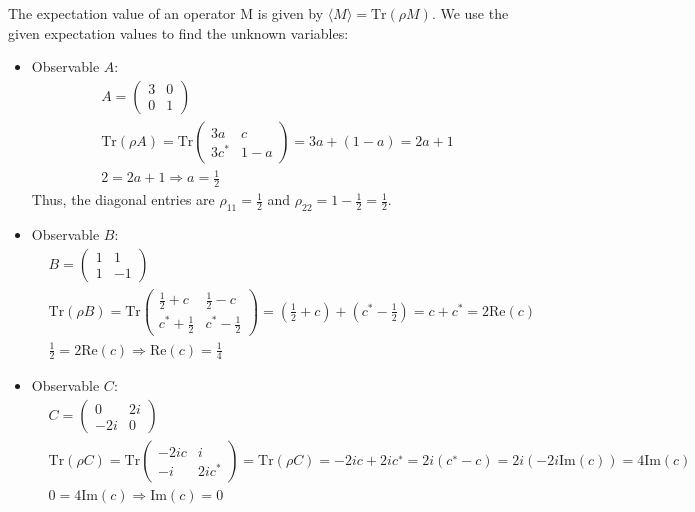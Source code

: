\documentclass{article}
\begin{document}
The expectation value of an operator M is given by $⟨M⟩=\text{Tr}(ρM)$. We use the given expectation values to find the unknown variables:
\begin{itemize}
    \item Observable $A$:
\begin{align}
    & A=
    \begin{pmatrix}
      3&0\\ 
      0&1
    \end{pmatrix}\\[0.2cm]
    & \text{Tr}(ρA)=\text{Tr}
    \begin{pmatrix}
    3a&c\\
    3c^*&1-a
    \end{pmatrix}
    =3a+(1−a)=2a+1\\[0.2cm]
    & 2=2a+1 \Rightarrow a=\frac{1}{2}
\end{align}
Thus, the diagonal entries are $\rho_{11}=\frac{1}{2}$ and $\rho_{22}=1−\frac{1}{2}=\frac{1}{2}$.

    \item Observable $B$:
\begin{align}
    & B=
    \begin{pmatrix}
      1&1\\ 
      1&-1
    \end{pmatrix}\\[0.2cm]
    & \text{Tr}(ρB) =\text{Tr}
    \begin{pmatrix}
    \frac{1}{2}+c&\frac{1}{2}-c\\
    c^*+\frac{1}{2}&c^*-\frac{1}{2}
    \end{pmatrix}
    =\left(\frac{1}{2}+c\right)+\left(c^*-\frac{1}{2}\right)=c+c^*=2\text{Re}(c)\\[0.2cm]
    & \frac{1}{2}=2\text{Re}(c) \Rightarrow \text{Re}(c)=\frac{1}{4}
\end{align}

\item Observable $C$:
\begin{align}
    & C=
    \begin{pmatrix}
      0&2i\\ 
      -2i&0
    \end{pmatrix}\\[0.2cm]
    & \text{Tr}(ρC) =\text{Tr}
    \begin{pmatrix}
    -2ic&i\\
    -i&2ic^*
    \end{pmatrix}
    =\text{Tr}(ρC)=−2ic+2ic^∗=2i(c^∗−c)=2i(−2i\text{Im}(c))=4\text{Im}(c)\\[0.2cm]
    & 0=4\text{Im}(c) \Rightarrow \text{Im}(c)=0
\end{align}
    \end{itemize}
\end{document}
